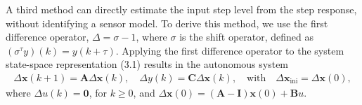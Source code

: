 \documentclass[11pt]{article}
\begin{document}
\begin{itemize}
    \color{blue}
    A third method can directly estimate the input step level from the step response, without identifying a sensor model.
    To derive this method, we use the first difference operator, $\Delta = \sigma - 1$, where $\sigma$ is the shift operator, defined as $(\sigma^\tau y) (k) = y(k + \tau)$.
    Applying the first difference operator to the system state-space representation (3.1) results in the autonomous system
    \begin{equation} \tag{3.10} \begin{aligned} \Delta \mathbf{x}(k+1) = \mathbf{A} \Delta \mathbf{x}(k), \quad \Delta {y}(k) = \mathbf{C} \Delta \mathbf{x}(k), \quad \text{with} \quad \Delta \mathbf{x}_{\text{ini}} = \Delta \mathbf{x}(0) , \label{eqn:ssalti} \end{aligned} \end{equation}
    where $\Delta {u}(k) = \mathbf{0}$, for $k \geq 0$, and
    $\Delta \mathbf{x}(0) = (\mathbf{A} - \mathbf{I}) \mathbf{x}(0) + \mathbf{B} {{u}}$.


\end{itemize}
\end{document}
